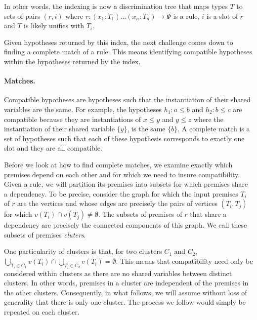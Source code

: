 \documentclass[runningheads]{llncs}
\begin{document}
In other words, the indexing is now a discrimination tree that maps types $T$ to sets of pairs $(r,i)$ where $r : (x_1 : T_1) \dots (x_n : T_n) \to \Psi$ is a rule, $i$ is a slot of $r$ and $T$ is likely unifies with $T_i$.

Given hypotheses returned by this index, the next challenge comes down to finding a complete match of a rule.
This means identifying compatible hypotheses within the hypotheses returned by the index.

\paragraph{Matches.}
Compatible hypotheses are hypotheses such that the instantiation of their shared variables are the same.
For example, the hypotheses $h_1 : a \leq b$ and $h_2 : b \leq c$ are compatible because they are instantiations of $x \leq y$ and $y \leq z$ where the instantiation of their shared variable $\{y\}$, is the same $\{b\}$.
A complete match is a set of hypotheses such that each of these hypothesis corresponds to exactly one slot and they are all compatible.

Before we look at how to find complete matches, we examine exactly which premises depend on each other and for which we need to insure compatibility.
Given a rule, we will partition its premises into subsets for which premises share a dependency.
To be precise, consider the graph for which the input premises $T_i$ of $r$ are the vertices and whose edges are precisely the pairs of vertices $(T_i, T_j)$ for which $v(T_i) \cap v(T_j) \neq \emptyset$.
The subsets of premises of $r$ that share a dependency are precisely the connected components of this graph.
We call these subsets of premises \textit{cluters}.


One particularity of clusters is that, for two clusters $C_1$ and $C_2$,
$\bigcup_{T_i \in C_1} v(T_i) \cap \bigcup_{T_i \in C_2} v(T_i) = \emptyset$.
This means that compatibility need only be considered within clusters as there are no shared variables between distinct clusters.
In other words, premises in a cluster are independent of the premises in the other clusters.
Consequently, in what follows, we will assume without loss of generality that there is only one cluster.
The process we follow would simply be repeated on each cluster.
\end{document}
